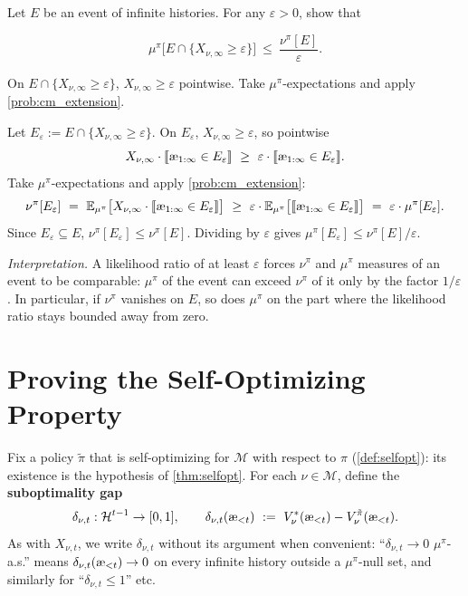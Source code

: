 \documentclass[fontsize=11pt, parskip=half]{scrartcl}
\newcommand{\cH}{\mathcal{H}}
\newcommand{\cM}{\mathcal{M}}
\newcommand{\Ex}{\mathbb{E}}
\newcommand{\aes}{\textnormal{\ae}}
\begin{document}
\begin{exercise}
\label{prob:markov_cm}
Let $E$ be an event of infinite histories. For any $\varepsilon > 0$, show that

\[
    \mu^\pi\big[E \cap \{X_{\nu,\infty} \geq \varepsilon\}\big] ~\leq~ \frac{\nu^\pi[E]}{\varepsilon}.
\]
\begin{hint}
On $E \cap \{X_{\nu,\infty} \geq \varepsilon\}$, $X_{\nu,\infty} \geq \varepsilon$ pointwise. Take $\mu^\pi$-expectations and apply \cref{prob:cm_extension}.
\end{hint}
\end{exercise}

\begin{solution}
Let $E_\varepsilon := E \cap \{X_{\nu,\infty} \geq \varepsilon\}$. On $E_\varepsilon$, $X_{\nu,\infty} \geq \varepsilon$, so pointwise
\[
    X_{\nu,\infty} \cdot \llbracket \aes_{1:\infty} \in E_\varepsilon \rrbracket
    ~\geq~ \varepsilon \cdot \llbracket \aes_{1:\infty} \in E_\varepsilon \rrbracket.
\]
Take $\mu^\pi$-expectations and apply \cref{prob:cm_extension}:
\[
    \nu^\pi[E_\varepsilon]
    ~=~ \Ex_{\mu^\pi}\big[X_{\nu,\infty} \cdot \llbracket \aes_{1:\infty} \in E_\varepsilon \rrbracket\big]
    ~\geq~ \varepsilon \cdot \Ex_{\mu^\pi}\big[\llbracket \aes_{1:\infty} \in E_\varepsilon \rrbracket\big]
    ~=~ \varepsilon \cdot \mu^\pi[E_\varepsilon].
\]
Since $E_\varepsilon \subseteq E$, $\nu^\pi[E_\varepsilon] \leq \nu^\pi[E]$. Dividing by $\varepsilon$ gives $\mu^\pi[E_\varepsilon] \leq \nu^\pi[E]/\varepsilon$.

\emph{Interpretation.} A likelihood ratio of at least $\varepsilon$ forces $\nu^\pi$ and $\mu^\pi$ measures of an event to be comparable: $\mu^\pi$ of the event can exceed $\nu^\pi$ of it only by the factor $1/\varepsilon$. In particular, if $\nu^\pi$ vanishes on $E$, so does $\mu^\pi$ on the part where the likelihood ratio stays bounded away from zero.
\end{solution}


\section{Proving the Self-Optimizing Property}\label{prob:selfopt}

Fix a policy $\tilde\pi$ that is self-optimizing for $\cM$ with respect to $\pi$ (\cref{def:selfopt}): its existence is the hypothesis of \cref{thm:selfopt}.
For each $\nu \in \cM$, define the \textbf{suboptimality gap}
\[
    \delta_{\nu,t} : \cH^{t-1} \to [0,1], \qquad \delta_{\nu,t}(\aes_{<t}) ~:=~ V_\nu^*(\aes_{<t}) - V_\nu^{\tilde\pi}(\aes_{<t}).
\]
As with $X_{\nu,t}$, we write $\delta_{\nu,t}$ without its argument when convenient: ``$\delta_{\nu,t} \to 0$ $\mu^\pi$-a.s.'' means $\delta_{\nu,t}(\aes_{<t}) \to 0$ on every infinite history outside a $\mu^\pi$-null set, and similarly for ``$\delta_{\nu,t} \leq 1$'' etc.
\end{document}
